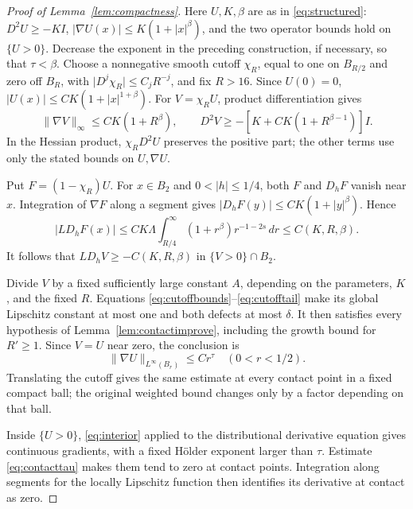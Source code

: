 \documentclass[11pt]{article}
\numberwithin{equation}{section}
\theoremstyle{remark}
\newcommand{\norm}[1]{\lVert #1\rVert}
\newcommand{\abs}[1]{\lvert #1\rvert}
\newcommand{\dd}{\,d}
\begin{document}
\begin{proof}[Proof of Lemma~\ref{lem:compactness}]
Here $U,K,\beta$ are as in \eqref{eq:structured}: $D^2U\ge-KI$, $\abs{\nabla U(x)}\le K(1+\abs{x}^\beta)$, and the two operator bounds hold on $\{U>0\}$. Decrease the exponent in the preceding construction, if necessary, so that $\tau<\beta$. Choose a nonnegative smooth cutoff $\chi_R$, equal to one on $B_{R/2}$ and zero off $B_R$, with $\abs{D^j\chi_R}\le C_jR^{-j}$, and fix $R>16$. Since $U(0)=0$,
$\abs{U(x)}\le CK(1+\abs{x}^{1+\beta})$. For $V=\chi_RU$, product differentiation gives
\begin{equation}\label{eq:cutoffbounds}
 \norm{\nabla V}_\infty\le CK(1+R^\beta),
 \qquad D^2V\ge-[K+CK(1+R^{\beta-1})]I.
\end{equation}
In the Hessian product, $\chi_RD^2U$ preserves the positive part; the other terms use only the stated bounds on $U,\nabla U$.

Put $F=(1-\chi_R)U$. For $x\in B_2$ and $0<\abs h\le1/4$, both $F$ and $D_hF$ vanish near $x$. Integration of $\nabla F$ along a segment gives $\abs{D_hF(y)}\le CK(1+\abs y^\beta)$. Hence
\begin{equation}\label{eq:cutofftail}
 \abs{LD_hF(x)}\le CK\Lambda\int_{R/4}^\infty
 (1+r^\beta)r^{-1-2s}\dd r\le C(K,R,\beta).
\end{equation}
It follows that $LD_hV\ge-C(K,R,\beta)$ in $\{V>0\}\cap B_2$.

Divide $V$ by a fixed sufficiently large constant $A$, depending on the parameters, $K$, and the fixed $R$. Equations \eqref{eq:cutoffbounds}--\eqref{eq:cutofftail} make its global Lipschitz constant at most one and both defects at most $\delta$. It then satisfies every hypothesis of Lemma~\ref{lem:contactimprove}, including the growth bound for $R'\ge1$. Since $V=U$ near zero, the conclusion is
\begin{equation}\label{eq:contacttau}
 \norm{\nabla U}_{L^\infty(B_r)}\le Cr^\tau\quad(0<r<1/2).
\end{equation}
Translating the cutoff gives the same estimate at every contact point in a fixed compact ball; the original weighted bound changes only by a factor depending on that ball.

Inside $\{U>0\}$, \eqref{eq:interior} applied to the distributional derivative equation gives continuous gradients, with a fixed H\"older exponent larger than $\tau$. Estimate \eqref{eq:contacttau} makes them tend to zero at contact points. Integration along segments for the locally Lipschitz function then identifies its derivative at contact as zero.


\end{proof}
\end{document}
